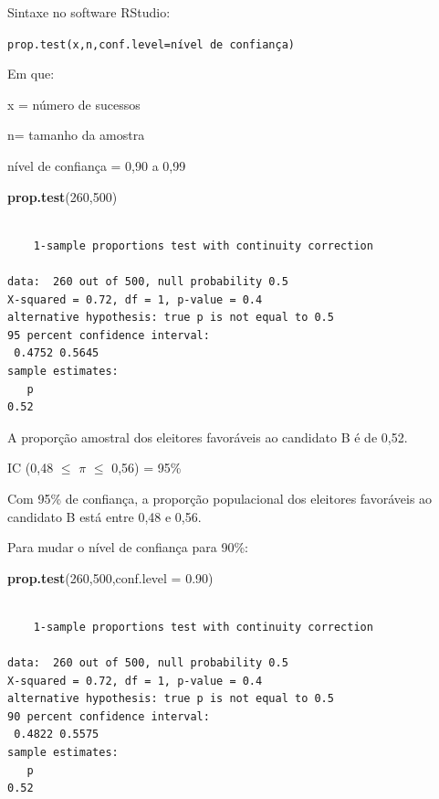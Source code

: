 \documentclass[12pt,brazil,oneside]{book}
\newenvironment{Shaded}{\begin{snugshade}}{\end{snugshade}}
\newcommand{\DataTypeTok}[1]{\textcolor[rgb]{0.13,0.29,0.53}{#1}}
\newcommand{\DecValTok}[1]{\textcolor[rgb]{0.00,0.00,0.81}{#1}}
\newcommand{\FloatTok}[1]{\textcolor[rgb]{0.00,0.00,0.81}{#1}}
\newcommand{\KeywordTok}[1]{\textcolor[rgb]{0.13,0.29,0.53}{\textbf{#1}}}
\newcommand{\NormalTok}[1]{#1}
\begin{document}
Sintaxe no software RStudio:

\texttt{prop.test(x,n,conf.level=nível\ de\ confiança)}

Em que:

x = número de sucessos

n= tamanho da amostra

nível de confiança = 0,90 a 0,99

\begin{Shaded}
\begin{Highlighting}[]
\KeywordTok{prop.test}\NormalTok{(}\DecValTok{260}\NormalTok{,}\DecValTok{500}\NormalTok{)}
\end{Highlighting}
\end{Shaded}

\begin{verbatim}

    1-sample proportions test with continuity correction

data:  260 out of 500, null probability 0.5
X-squared = 0.72, df = 1, p-value = 0.4
alternative hypothesis: true p is not equal to 0.5
95 percent confidence interval:
 0.4752 0.5645
sample estimates:
   p 
0.52 
\end{verbatim}

A proporção amostral dos eleitores favoráveis ao candidato B é de 0,52.

IC (0,48 \(\leq\) \(\pi\) \(\leq\) 0,56) = 95\%

Com 95\% de confiança, a proporção populacional dos eleitores favoráveis ao candidato B está entre 0,48 e 0,56.

Para mudar o nível de confiança para 90\%:

\begin{Shaded}
\begin{Highlighting}[]
\KeywordTok{prop.test}\NormalTok{(}\DecValTok{260}\NormalTok{,}\DecValTok{500}\NormalTok{,}\DataTypeTok{conf.level =} \FloatTok{0.90}\NormalTok{)}
\end{Highlighting}
\end{Shaded}

\begin{verbatim}

    1-sample proportions test with continuity correction

data:  260 out of 500, null probability 0.5
X-squared = 0.72, df = 1, p-value = 0.4
alternative hypothesis: true p is not equal to 0.5
90 percent confidence interval:
 0.4822 0.5575
sample estimates:
   p 
0.52 
\end{verbatim}
\end{document}
